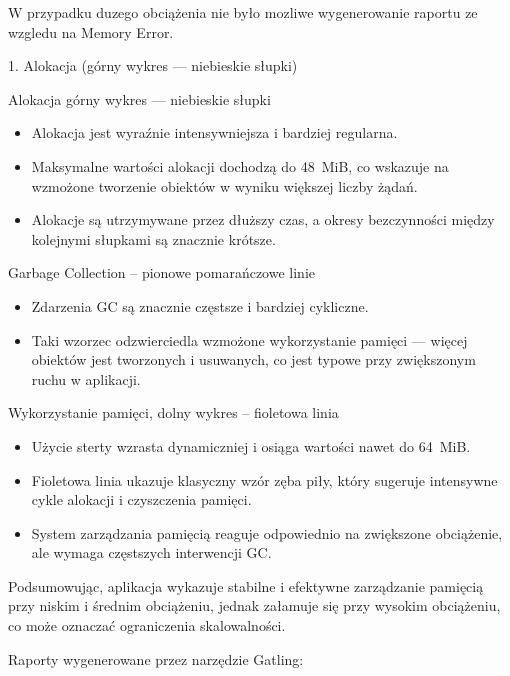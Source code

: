 \documentclass[runningheads,12pt]{llncs}
\begin{document}
W przypadku duzego obciążenia nie było mozliwe wygenerowanie raportu ze wzgledu na Memory Error.

1. Alokacja (górny wykres — niebieskie słupki)

Alokacja górny wykres — niebieskie słupki

\begin{itemize}
  \item Alokacja jest wyraźnie intensywniejsza i bardziej regularna.
  \item Maksymalne wartości alokacji dochodzą do 48~MiB, co wskazuje na wzmożone tworzenie obiektów w wyniku większej liczby żądań.
  \item Alokacje są utrzymywane przez dłuższy czas, a okresy bezczynności między kolejnymi słupkami są znacznie krótsze.
\end{itemize}

Garbage Collection – pionowe pomarańczowe linie

\begin{itemize}
  \item Zdarzenia GC są znacznie częstsze i bardziej cykliczne.
  \item Taki wzorzec odzwierciedla wzmożone wykorzystanie pamięci — więcej obiektów jest tworzonych i usuwanych, co jest typowe przy zwiększonym ruchu w aplikacji.
\end{itemize}

Wykorzystanie pamięci, dolny wykres – fioletowa linia

\begin{itemize}
  \item Użycie sterty wzrasta dynamiczniej i osiąga wartości nawet do 64~MiB.
  \item Fioletowa linia ukazuje klasyczny wzór zęba piły, który sugeruje intensywne cykle alokacji i czyszczenia pamięci.
  \item System zarządzania pamięcią reaguje odpowiednio na zwiększone obciążenie, ale wymaga częstszych interwencji GC.
\end{itemize}

Podsumowując, aplikacja wykazuje stabilne i efektywne zarządzanie pamięcią przy niskim i średnim obciążeniu, jednak załamuje się przy wysokim obciążeniu, co może oznaczać ograniczenia skalowalności.

\newpage

Raporty wygenerowane przez narzędzie Gatling:

\end{document}
